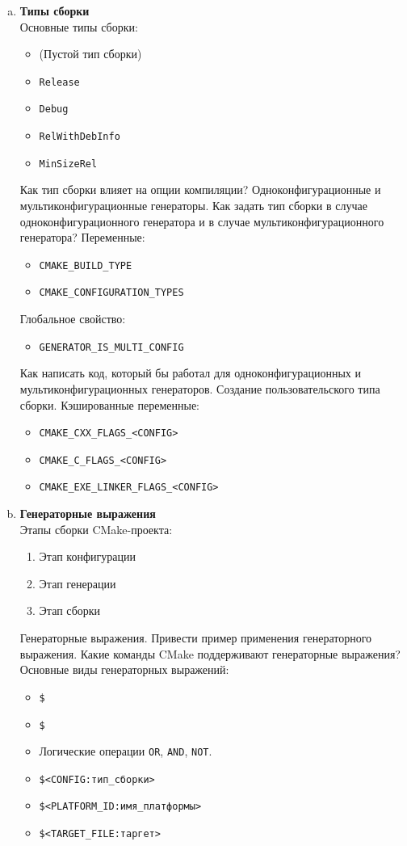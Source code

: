 \documentclass{article}
\begin{document}
\begin{enumerate}
\begin{enumerate}[a.]
\item \textbf{Типы сборки}\\
Основные типы сборки:
\begin{itemize}
\item (Пустой тип сборки)
\item \texttt{Release}
\item \texttt{Debug}
\item \texttt{RelWithDebInfo}
\item \texttt{MinSizeRel}
\end{itemize}
Как тип сборки влияет на опции компиляции? 
Одноконфигурационные и мультиконфигурационные генераторы. Как задать тип сборки в случае одноконфигурационного генератора и в случае мультиконфигурационного генератора? Переменные:
\begin{itemize}
\item \texttt{CMAKE\_BUILD\_TYPE}
\item \texttt{CMAKE\_CONFIGURATION\_TYPES}
\end{itemize}
Глобальное свойство:
\begin{itemize}
\item \texttt{GENERATOR\_IS\_MULTI\_CONFIG}
\end{itemize}
Как написать код, который бы работал для одноконфигурационных и мультиконфигурационных генераторов.
Создание пользовательского типа сборки. Кэшированные переменные:
\begin{itemize}
\item \texttt{CMAKE\_CXX\_FLAGS\_<CONFIG>}
\item \texttt{CMAKE\_C\_FLAGS\_<CONFIG>}
\item \texttt{CMAKE\_EXE\_LINKER\_FLAGS\_<CONFIG>}
\end{itemize}
\item \textbf{Генераторные выражения}\\
Этапы сборки CMake-проекта:
\begin{enumerate}
\item Этап конфигурации
\item Этап генерации
\item Этап сборки
\end{enumerate}

Генераторные выражения. Привести пример применения генераторного выражения. Какие команды CMake поддерживают генераторные выражения? Основные виды генераторных выражений:
\begin{itemize}
\item \texttt{\$<условие:значение>}
\item \texttt{\$<BOOL:значение>}
\item Логические операции \texttt{OR}, \texttt{AND},  \texttt{NOT}.
\item \texttt{\$<CONFIG:тип\_сборки>}
\item \texttt{\$<PLATFORM\_ID:имя\_платформы>}
\item \texttt{\$<TARGET\_FILE:таргет>}
\end{itemize}



\end{enumerate}
\end{enumerate}
\end{document}
